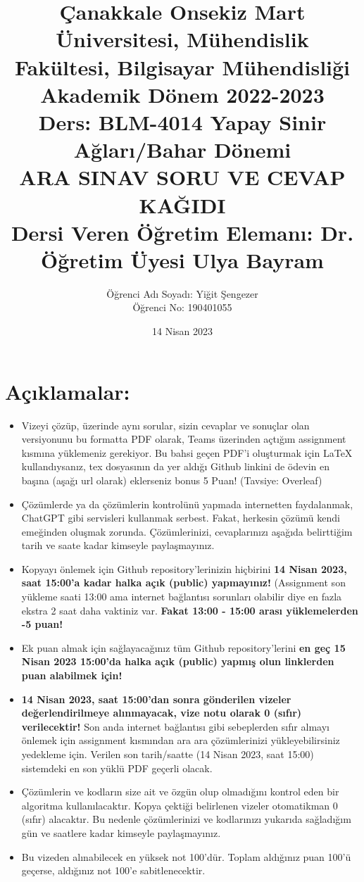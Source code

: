 \documentclass[11pt]{article}
\title{Çanakkale Onsekiz Mart Üniversitesi, Mühendislik Fakültesi, Bilgisayar Mühendisliği Akademik Dönem 2022-2023\\
Ders: BLM-4014 Yapay Sinir Ağları/Bahar Dönemi\\ 
ARA SINAV SORU VE CEVAP KAĞIDI\\
Dersi Veren Öğretim Elemanı: Dr. Öğretim Üyesi Ulya Bayram}
\author{%
\begin{minipage}{\textwidth}
\raggedright
Öğrenci Adı Soyadı: Yiğit Şengezer\\ %
Öğrenci No: 190401055
\end{minipage}%
}
\date{14 Nisan 2023}
\begin{document}
\maketitle

\vspace{-.5in}
\section*{Açıklamalar:}
\begin{itemize}
    \item Vizeyi çözüp, üzerinde aynı sorular, sizin cevaplar ve sonuçlar olan versiyonunu bu formatta PDF olarak, Teams üzerinden açtığım assignment kısmına yüklemeniz gerekiyor. Bu bahsi geçen PDF'i oluşturmak için LaTeX kullandıysanız, tex dosyasının da yer aldığı Github linkini de ödevin en başına (aşağı url olarak) eklerseniz bonus 5 Puan! (Tavsiye: Overleaf)
    \item Çözümlerde ya da çözümlerin kontrolünü yapmada internetten faydalanmak, ChatGPT gibi servisleri kullanmak serbest. Fakat, herkesin çözümü kendi emeğinden oluşmak zorunda. Çözümlerinizi, cevaplarınızı aşağıda belirttiğim tarih ve saate kadar kimseyle paylaşmayınız. 
    \item Kopyayı önlemek için Github repository'lerinizin hiçbirini \textbf{14 Nisan 2023, saat 15:00'a kadar halka açık (public) yapmayınız!} (Assignment son yükleme saati 13:00 ama internet bağlantısı sorunları olabilir diye en fazla ekstra 2 saat daha vaktiniz var. \textbf{Fakat 13:00 - 15:00 arası yüklemelerden -5 puan!}
    \item Ek puan almak için sağlayacağınız tüm Github repository'lerini \textbf{en geç 15 Nisan 2023 15:00'da halka açık (public) yapmış olun linklerden puan alabilmek için!}
    \item \textbf{14 Nisan 2023, saat 15:00'dan sonra gönderilen vizeler değerlendirilmeye alınmayacak, vize notu olarak 0 (sıfır) verilecektir!} Son anda internet bağlantısı gibi sebeplerden sıfır almayı önlemek için assignment kısmından ara ara çözümlerinizi yükleyebilirsiniz yedekleme için. Verilen son tarih/saatte (14 Nisan 2023, saat 15:00) sistemdeki en son yüklü PDF geçerli olacak.
    \item Çözümlerin ve kodların size ait ve özgün olup olmadığını kontrol eden bir algoritma kullanılacaktır. Kopya çektiği belirlenen vizeler otomatikman 0 (sıfır) alacaktır. Bu nedenle çözümlerinizi ve kodlarınızı yukarıda sağladığım gün ve saatlere kadar kimseyle paylaşmayınız.
    \item Bu vizeden alınabilecek en yüksek not 100'dür. Toplam aldığınız puan 100'ü geçerse, aldığınız not 100'e sabitlenecektir.

\end{itemize}
\end{document}
